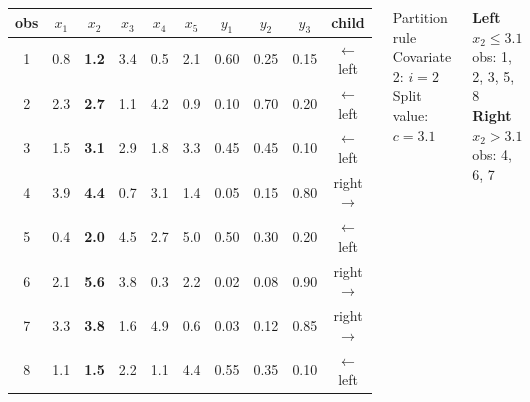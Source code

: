 \begin{frame}{}
{\begin{columns}[T]
 \begin{center}
\renewcommand{\arraystretch}{1.6}
\begin{tabular}{c|c>{\columncolor{purple!20}}cc>{\columncolor{purple!20}}cc|ccc|c}
\textbf{obs} & $x_1$ & \cellcolor{purple!50}$x_2$ & $x_3$ & \cellcolor{purple!20}$x_4$ & $x_5$ & $y_1$ & $y_2$ & $y_3$ & \textbf{child} \\
\hline
\rowcolor{blue!15}
1 & 0.8 & \textbf{1.2} & 3.4 & 0.5 & 2.1 & 0.60 & 0.25 & 0.15 & \textcolor{blue!80!black}{$\leftarrow$ left} \\
\rowcolor{blue!15}
2 & 2.3 & \textbf{2.7} & 1.1 & 4.2 & 0.9 & 0.10 & 0.70 & 0.20 & \textcolor{blue!80!black}{$\leftarrow$ left} \\
\rowcolor{blue!15}
3 & 1.5 & \textbf{3.1} & 2.9 & 1.8 & 3.3 & 0.45 & 0.45 & 0.10 & \textcolor{blue!80!black}{$\leftarrow$ left} \\
\rowcolor{red!15}
4 & 3.9 & \textbf{4.4} & 0.7 & 3.1 & 1.4 & 0.05 & 0.15 & 0.80 & \textcolor{red!80!black}{right $\rightarrow$} \\
\rowcolor{blue!15}
5 & 0.4 & \textbf{2.0} & 4.5 & 2.7 & 5.0 & 0.50 & 0.30 & 0.20 & \textcolor{blue!80!black}{$\leftarrow$ left} \\
\rowcolor{red!15}
6 & 2.1 & \textbf{5.6} & 3.8 & 0.3 & 2.2 & 0.02 & 0.08 & 0.90 & \textcolor{red!80!black}{right $\rightarrow$} \\
\rowcolor{red!15}
7 & 3.3 & \textbf{3.8} & 1.6 & 4.9 & 0.6 & 0.03 & 0.12 & 0.85 & \textcolor{red!80!black}{right $\rightarrow$} \\
\rowcolor{blue!15}
8 & 1.1 & \textbf{1.5} & 2.2 & 1.1 & 4.4 & 0.55 & 0.35 & 0.10 & \textcolor{blue!80!black}{$\leftarrow$ left} \\
\end{tabular}
\end{center}

  \vspace{1em}
  \begin{block}{Partition rule}
    Covariate 2: $i=2$ \\ Split value: $c =3.1$\\
    
  \end{block}
  \vspace{0.8em}
  \textcolor{blue!80!black}{\textbf{Left}} \\
  \hspace{0.5em} $x_2 \leq 3.1$ \\[0.2em]
  \hspace{0.5em} obs: 1, 2, 3, 5, 8 \\[0.6em]
  \textcolor{red!80!black}{\textbf{Right}} \\
   \hspace{0.5em} $x_2 > 3.1$ \\
  \hspace{0.5em} obs: 4, 6, 7


\end{columns}
}


\end{frame}





